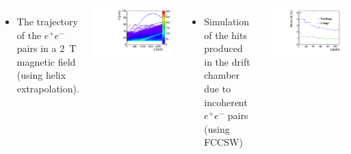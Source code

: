 \documentclass[final,xcolor={dvipsnames,svgnames,x11names,table}]{beamer}
\begin{document}
\begin{frame}
\begin{textblock}{43}
\begin{tcolorbox}[title=Beam-induced backgrounds and the impact on the drift chamber]
  \begin{columns}
      \begin{itemize}
        \item The trajectory of the $e^+e^−$ pairs in a 2~T magnetic field (using helix extrapolation).
      \end{itemize}
      \centering
      \includegraphics[width=\textwidth]{../figures/pairs_R_Z}


    \begin{itemize}
      \item Simulation of the hits produced in the drift chamber due to incoherent $e^+e^-$ pairs (using FCCSW)
    \end{itemize}
    \centering
    \includegraphics[width=\textwidth]{Figures/incoherent_top_Z.pdf}





\end{columns}
\end{tcolorbox}
\end{textblock}
\end{frame}
\end{document}
